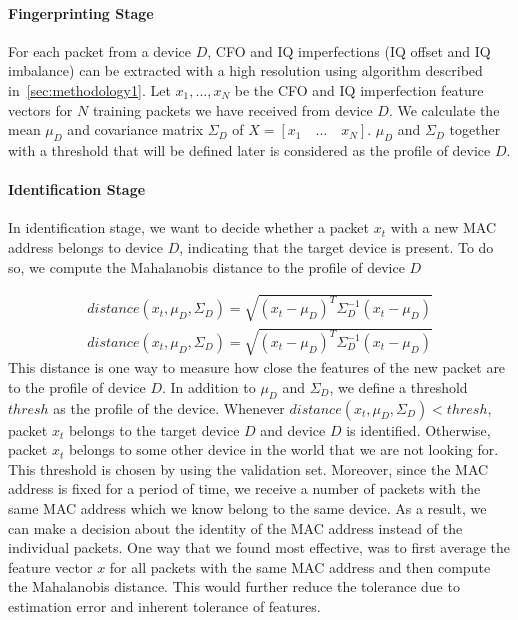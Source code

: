 \paragraph{Fingerprinting Stage} For each packet from a device $D$, CFO and IQ imperfections (IQ offset and IQ imbalance) can be extracted with a high resolution using algorithm described in~\ref{sec:methodology1}. Let $x_1,...,x_N$ be the CFO and IQ imperfection feature vectors for $N$ training packets we have received from device $D$. We calculate the mean $\mu_D$ and covariance matrix $\Sigma_D$ of $X = [x_1 \quad ... \quad x_N]$. $\mu_D$ and $\Sigma_D$ together with a threshold that will be defined later is considered as the profile of device $D$.



\paragraph{Identification Stage} In identification stage, we want to decide whether a packet $x_t$ with a new MAC address belongs to device $D$, indicating that the target device is present. To do so, we compute the Mahalanobis distance to the profile of device $D$

\begin{gather*}
    distance(x_t,\mu_D,\Sigma_D) = \sqrt{(x_t-\mu_D)^T\Sigma_D^{-1}(x_t-\mu_D)}
\end{gather*}
\begin{gather*}
    distance(x_t,\mu_D,\Sigma_D) = \sqrt{(x_t-\mu_D)^T\Sigma_D^{-1}(x_t-\mu_D)}
\end{gather*}
This distance is one way to measure how close the features of the new packet are to the profile of device $D$. In addition to $\mu_D$ and $\Sigma_D$, we define a threshold $thresh$ as the profile of the device. Whenever $distance(x_t,\mu_D,\Sigma_D)<thresh$, packet $x_t$ belongs to the target device $D$ and device $D$ is identified. Otherwise, packet $x_t$ belongs to some other device in the world that we are not looking for. This threshold is chosen by using the validation set.
Moreover, since the MAC address is fixed for a period of time, we receive a number of packets with the same MAC address which we know belong to the same device. As a result, we can make a decision about the identity of the MAC address instead of the individual packets. One way that we found most effective, was to first average the feature vector $x$ for all packets with the same MAC address and then compute the Mahalanobis distance. This would further reduce the tolerance due to estimation error and inherent tolerance of features.


\fi



